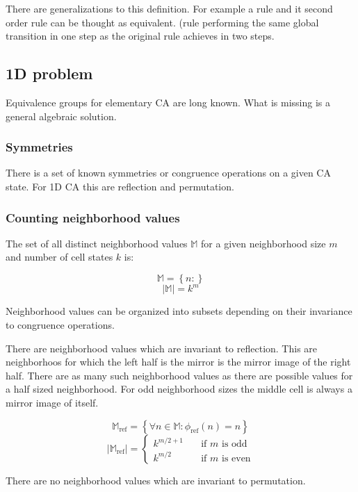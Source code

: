 \documentclass{ijuc}
\begin{document}
There are generalizations to this definition. For example a rule and it second order rule can be thought as equivalent.
(rule performing the same global transition in one step as the original rule achieves in two steps.

\subsection{1D problem}

Equivalence groups for elementary CA are long known. What is missing is a general algebraic solution.

\subsubsection{Symmetries}

There is a set of known symmetries or congruence operations on a given CA state.
For 1D CA this are reflection and permutation. 

\subsubsection{Counting neighborhood values}

The set of all distinct neighborhood values $\mathbb{M}$ for a given neighborhood size $m$ and
number of cell states $k$ is:

\[ \mathbb{M} = \left\{ n : \right\} \]
\[ \vert \mathbb{M} \vert = k^m \]

Neighborhood values can be organized into subsets depending on their invariance to congruence operations.

There are neighborhood values which are invariant to reflection. This are neighborhoos for which the
left half is the mirror is the mirror image of the right half. There are as many such neighborhood
values as there are possible values for a half sized neighborhood. For odd neighborhood sizes the middle
cell is always a mirror image of itself.

\[ \mathbb{M}_\mathrm{ref} = \left\{ \forall n \in \mathbb{M} : \phi_\mathrm{ref}(n) = n \right\} \]
\[ \vert \mathbb{M}_\mathrm{ref} \vert = \left\{ 
  \begin{array}{ll}
    {k^{m/2+1}} & \quad \textrm{if $m$ is odd }\\
    {k^{m/2  }} & \quad \textrm{if $m$ is even}
  \end{array} \right.
\]

There are no neighborhood values which are invariant to permutation.
\end{document}
